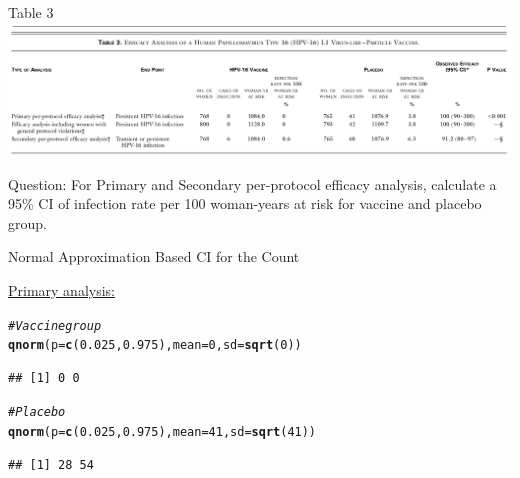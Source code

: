 \documentclass[10pt,handout]{beamer}\usepackage[]{graphicx}\usepackage[]{color}
\makeatletter
\newcommand{\hlnum}[1]{\textcolor[rgb]{0.686,0.059,0.569}{#1}}%
\newcommand{\hlcom}[1]{\textcolor[rgb]{0.678,0.584,0.686}{\textit{#1}}}%
\newcommand{\hlstd}[1]{\textcolor[rgb]{0.345,0.345,0.345}{#1}}%
\newcommand{\hlkwc}[1]{\textcolor[rgb]{0.333,0.667,0.333}{#1}}%
\newcommand{\hlkwd}[1]{\textcolor[rgb]{0.737,0.353,0.396}{\textbf{#1}}}%
\newenvironment{kframe}{%
 \def\at@end@of@kframe{}%
 \ifinner\ifhmode%
  \def\at@end@of@kframe{\end{minipage}}%
  \begin{minipage}{\columnwidth}%
 \fi\fi%
 \def\FrameCommand##1{\hskip\@totalleftmargin \hskip-\fboxsep
 \colorbox{shadecolor}{##1}\hskip-\fboxsep
     \hskip-\linewidth \hskip-\@totalleftmargin \hskip\columnwidth}%
 \MakeFramed {\advance\hsize-\width
   \@totalleftmargin\z@ \linewidth\hsize
   \@setminipage}}%
 {\par\unskip\endMakeFramed%
 \at@end@of@kframe}
\newenvironment{knitrout}{}{} %
\makeatother
\begin{document}
\begin{frame}{Table 3}
	\includegraphics[scale=0.3]{nejm_tab3.png}
	
	\vspace{0.5in}
	\alert{Question}: For Primary and Secondary per-protocol efficacy analysis, calculate a 95\% CI of infection rate per 100 woman-years at risk for vaccine and placebo group.
	
\end{frame}


\begin{frame}[fragile]{Normal Approximation Based CI for the Count}
	
	\underline{Primary analysis:}
	\vspace{0.1in}
\begin{knitrout}\tiny
{}\color{fgcolor}\begin{kframe}
\begin{alltt}
\hlcom{# Vaccine group}
\hlkwd{qnorm}\hlstd{(}\hlkwc{p} \hlstd{=} \hlkwd{c}\hlstd{(}\hlnum{0.025}\hlstd{,} \hlnum{0.975}\hlstd{),} \hlkwc{mean} \hlstd{=} \hlnum{0}\hlstd{,} \hlkwc{sd} \hlstd{=} \hlkwd{sqrt}\hlstd{(}\hlnum{0}\hlstd{))}
\end{alltt}
\begin{verbatim}
## [1] 0 0
\end{verbatim}
\begin{alltt}
\hlcom{# Placebo}
\hlkwd{qnorm}\hlstd{(}\hlkwc{p} \hlstd{=} \hlkwd{c}\hlstd{(}\hlnum{0.025}\hlstd{,} \hlnum{0.975}\hlstd{),} \hlkwc{mean} \hlstd{=} \hlnum{41}\hlstd{,} \hlkwc{sd} \hlstd{=} \hlkwd{sqrt}\hlstd{(}\hlnum{41}\hlstd{))}
\end{alltt}
\begin{verbatim}
## [1] 28 54
\end{verbatim}
\end{kframe}
\end{knitrout}
	
\end{frame}
\end{document}
